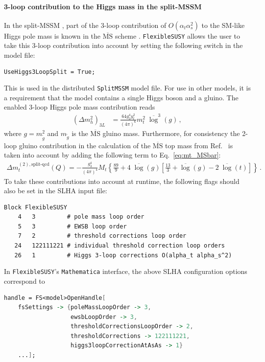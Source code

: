 \documentclass[final,3p,11pt,pdflatex]{elsarticle}
\makeatletter
\newcommand{\modelname}[1]{\texttt{#1}\@\xspace}
\newcommand{\fs}{\texttt{FlexibleSUSY}\@\xspace}
\newcommand{\mathematica}{\texttt{Ma\-the\-ma\-ti\-ca}\xspace}
\newcommand{\ol}[1]{\overline{#1}}
\newcommand{\MSbar}{\ensuremath{\ol{\text{MS}}}\xspace}
\newcommand{\barlog}{\overline{\log}}
\def\at{\alpha_t}
\def\as{\alpha_s}
\makeatother
\begin{document}
\paragraph{3-loop contribution to the Higgs mass in the split-MSSM}

In the split-MSSM \cite{Bagnaschi:2014rsa}, part of the 3-loop
contribution of $O(\at \as^2)$
to the SM-like Higgs pole mass is known in the \MSbar
scheme \cite{Benakli:2013msa}.  \fs allows the user to take this
3-loop contribution into account by setting the following switch in
the model file:
%
\begin{lstlisting}
UseHiggs3LoopSplit = True;
\end{lstlisting}
%
This is used in the distributed \modelname{SplitMSSM} model file. For use in
other models, it is a requirement that the model contains a single
Higgs boson and a gluino.  The enabled 3-loop Higgs pole mass
contribution reads
%
\begin{align}
  (\Delta m_h^2)_{3L} &= \frac{64 g_3^4 y_t^2}{(4\pi)^6} m_t^2\;\barlog^3(g) \,,
\end{align}
%
where $g = m_{\tilde{g}}^2$ and $m_{\tilde{g}}$ is the \MSbar gluino
mass.  Furthermore, for consistency the 2-loop gluino contribution in
the calculation of the \MSbar top mass from Ref.\
\cite{Benakli:2013msa} is taken into account by adding the following
term to Eq.\ \eqref{eq:mt_MSbar}:
%
\begin{align}
  \Delta m_t^{(2),\text{split-qcd}}(Q) =
  -\frac{g_3^4}{(4\pi)^4} M_t \left\{
     \frac{89}{9}
     + 4\;\barlog(g) \left[
        \frac{13}{3}
        + \barlog(g)
        - 2\;\barlog(t)
     \right]
  \right\} \,.
\end{align}
%
To take these contributions into account at runtime, the following flags
should also be set in the SLHA input file:
%
\begin{lstlisting}
Block FlexibleSUSY
    4   3         # pole mass loop order
    5   3         # EWSB loop order
    7   2         # threshold corrections loop order
   24   122111221 # individual threshold correction loop orders
   26   1         # Higgs 3-loop corrections O(alpha_t alpha_s^2)
\end{lstlisting}
%
In \fs's \mathematica interface, the above SLHA configuration options
correspond to
%
\\\begin{minipage}{\linewidth}
\begin{lstlisting}[language=Mathematica]
handle = FS<model>OpenHandle[
    fsSettings -> {poleMassLoopOrder -> 3,
                   ewsbLoopOrder -> 3,
                   thresholdCorrectionsLoopOrder -> 2,
                   thresholdCorrections -> 122111221,
                   higgs3loopCorrectionAtAsAs -> 1}
    ...];
\end{lstlisting}
\end{minipage}
\end{document}
